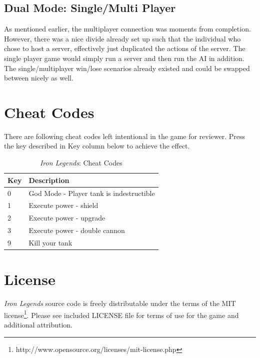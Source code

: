\documentclass[letterpaper,11pt,twoside]{article}
\begin{document}
\subsection{Dual Mode: Single/Multi Player}

As mentioned earlier, the multiplayer connection was moments from completion. However, there was a nice divide already set up such that the individual who chose to host a server, effectively just duplicated the actions of the server. The single player game would simply run a server and then run the AI in addition. The single/multiplayer win/lose scenarios already existed and could be swapped between nicely as well.

\section{Cheat Codes}

There are following cheat codes left intentional in the game for reviewer.
Press the key described in Key column below to achieve the effect.

\begin{table}[htb]
	\centering
		\begin{tabular}{l|l}
		  \toprule
			Key & Description \\
			\midrule
            0 & God Mode - Player tank is indestructible \\
            1 & Execute power - shield \\
            2 & Execute power - upgrade \\
            3 & Execute power - double cannon \\
            9 & Kill your tank \\
			\bottomrule
		\end{tabular}
	\caption{\emph{Iron Legends}: Cheat Codes}
\end{table}


\section{License}
\emph{Iron Legends} source code is freely distributable under the terms of the MIT license\footnote{http://www.opensource.org/licenses/mit-license.php}.
Please see included LICENSE file for terms of use for the game and additional attribution.
\end{document}
